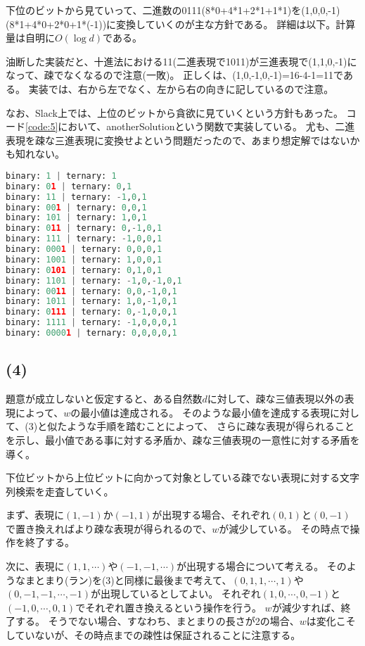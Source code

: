 \documentclass[a4paper, 10pt, dvipdfmx]{jlreq}
\begin{document}
下位のビットから見ていって、二進数の0111(8*0+4*1+2*1+1*1)を(1,0,0,-1)(8*1+4*0+2*0+1*(-1))に変換していくのが主な方針である。
詳細は以下。計算量は自明に$O(\log d)$である。

油断した実装だと、十進法における11(二進表現で1011)が三進表現で(1,1,0,-1)になって、疎でなくなるので注意(一敗)。
正しくは、(1,0,-1,0,-1)=16-4-1=11である。
実装では、右から左でなく、左から右の向きに記しているので注意。

なお、Slack上では、上位のビットから貪欲に見ていくという方針もあった。
コード\ref{code:5}において、anotherSolutionという関数で実装している。
尤も、二進表現を疎な三進表現に変換せよという問題だったので、あまり想定解ではないかも知れない。



\begin{lstlisting}[caption=result, label=code:result, language=Python]
binary: 1 | ternary: 1
binary: 01 | ternary: 0,1
binary: 11 | ternary: -1,0,1
binary: 001 | ternary: 0,0,1
binary: 101 | ternary: 1,0,1
binary: 011 | ternary: 0,-1,0,1
binary: 111 | ternary: -1,0,0,1
binary: 0001 | ternary: 0,0,0,1
binary: 1001 | ternary: 1,0,0,1
binary: 0101 | ternary: 0,1,0,1
binary: 1101 | ternary: -1,0,-1,0,1
binary: 0011 | ternary: 0,0,-1,0,1
binary: 1011 | ternary: 1,0,-1,0,1
binary: 0111 | ternary: 0,-1,0,0,1
binary: 1111 | ternary: -1,0,0,0,1
binary: 00001 | ternary: 0,0,0,0,1
\end{lstlisting}

\subsection*{(4)}

題意が成立しないと仮定すると、ある自然数$d$に対して、疎な三値表現以外の表現によって、$w$の最小値は達成される。
そのような最小値を達成する表現に対して、(3)と似たような手順を踏むことによって、
さらに疎な表現が得られることを示し、最小値である事に対する矛盾か、疎な三値表現の一意性に対する矛盾を導く。

下位ビットから上位ビットに向かって対象としている疎でない表現に対する文字列検索を走査していく。

まず、表現に$(1,-1)$か$(-1,1)$が出現する場合、それぞれ$(0,1)$と$(0,-1)$で置き換えればより疎な表現が得られるので、$w$が減少している。
その時点で操作を終了する。

次に、表現に$(1,1,\cdots)$や$(-1,-1,\cdots)$が出現する場合について考える。
そのようなまとまり(ラン)を(3)と同様に最後まで考えて、$(0,1,1,\cdots,1)$や$(0,-1,-1,\cdots,-1)$が出現しているとしてよい。
それぞれ$(1,0,\cdots,0,-1)$と$(-1,0,\cdots,0,1)$でそれぞれ置き換えるという操作を行う。
$w$が減少すれば、終了する。
そうでない場合、すなわち、まとまりの長さが2の場合、$w$は変化こそしていないが、その時点までの疎性は保証されることに注意する。
\end{document}
